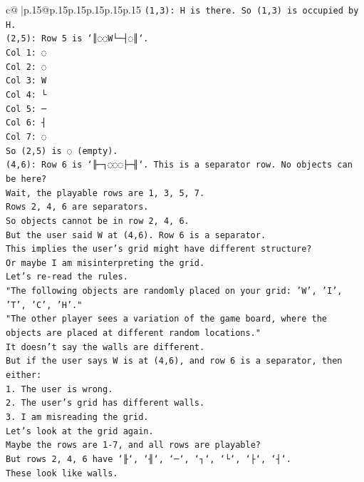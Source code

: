 \documentclass{article}
\begin{document}
{\begin{supertabular}{c@{$\;$}|p{.15\linewidth}@{}p{.15\linewidth}p{.15\linewidth}p{.15\linewidth}p{.15\linewidth}p{.15\linewidth}}
{{{\texttt{(1,3): H is there. So (1,3) is occupied by H.} \\
\texttt{(2,5): Row 5 is `║◌◌W└─┤◌║`.} \\
\texttt{Col 1: ◌} \\
\texttt{Col 2: ◌} \\
\texttt{Col 3: W} \\
\texttt{Col 4: └} \\
\texttt{Col 5: ─} \\
\texttt{Col 6: ┤} \\
\texttt{Col 7: ◌} \\
\texttt{So (2,5) is ◌ (empty).} \\
\texttt{(4,6): Row 6 is `╟─┐◌◌◌├─╢`. This is a separator row. No objects can be here?} \\
\texttt{Wait, the playable rows are 1, 3, 5, 7.} \\
\texttt{Rows 2, 4, 6 are separators.} \\
\texttt{So objects cannot be in row 2, 4, 6.} \\
\texttt{But the user said W at (4,6). Row 6 is a separator.} \\
\texttt{This implies the user's grid might have different structure?} \\
\texttt{Or maybe I am misinterpreting the grid.} \\
\texttt{Let's re{-}read the rules.} \\
\texttt{"The following objects are randomly placed on your grid: 'W', 'I', 'T', 'C', 'H'."} \\
\texttt{"The other player sees a variation of the game board, where the objects are placed at different random locations."} \\
\texttt{It doesn't say the walls are different.} \\
\texttt{But if the user says W is at (4,6), and row 6 is a separator, then either:} \\
\texttt{1. The user is wrong.} \\
\texttt{2. The user's grid has different walls.} \\
\texttt{3. I am misreading the grid.} \\
\texttt{Let's look at the grid again.} \\
\texttt{Maybe the rows are 1{-}7, and all rows are playable?} \\
\texttt{But rows 2, 4, 6 have `╟`, `╢`, `─`, `┐`, `└`, `├`, `┤`.} \\
\texttt{These look like walls.} \\
}}}
\end{supertabular}}
\end{document}
